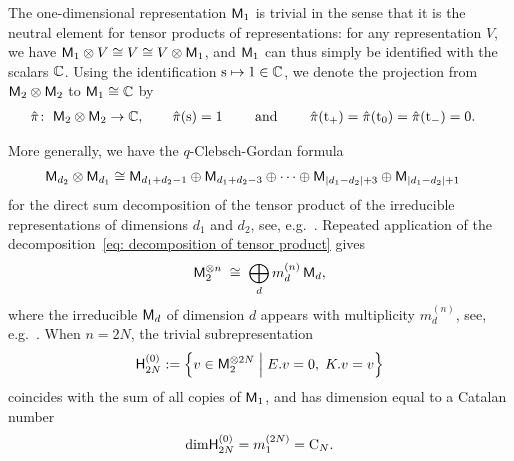 \documentclass[oneside,english]{amsart}
\numberwithin{equation}{section}
\numberwithin{figure}{section}
\theoremstyle{plain}
\theoremstyle{plain}
\theoremstyle{plain}
\theoremstyle{remark}
\theoremstyle{plain}
\theoremstyle{plain}
\theoremstyle{plain}
\theoremstyle{plain}
\theoremstyle{plain}
\theoremstyle{plain}
\theoremstyle{plain}
\theoremstyle{plain}
\newcommand{\blue}[1]{{\color{blue} #1}}
\begin{document}
The one-dimensional representation $\mathsf{M}_1$ is trivial in the sense that
it is the neutral element for tensor products of representations: for any representation $V$,
we have $\mathsf{M}_1 \otimes V \cong V \cong V \otimes \mathsf{M}_1$, and
$\mathsf{M}_1$ can thus simply be identified with 
the scalars $\mathbb{C}$.
Using the identification $\mathrm{s} \mapsto 1 \in \mathbb{C}$, we denote the
projection from $\mathsf{M}_2 \otimes \mathsf{M}_2$ to $\mathsf{M}_1 \cong \mathbb{C}$ by
\begin{align}\label{eq: projection to singlet}
\hat{\pi}\colon\; &\mathsf{M}_{2}\otimes\mathsf{M}_{2}\to \mathbb{C} , \qquad
\hat{\pi}(\mathrm{s}) = 1 \qquad \text{ and } \qquad
\hat{\pi}(\mathrm{t}_{+}) = \hat{\pi}(\mathrm{t}_{0}) = \hat{\pi}(\mathrm{t}_{-}) = 0 .
\end{align}

More generally, we have the $q$-Clebsch-Gordan formula
\begin{align}\label{eq: decomposition of tensor product}
\mathsf{M}_{d_{2}}\otimes\mathsf{M}_{d_{1}}\cong\; &
    \mathsf{M}_{d_{1}+d_{2}-1}\oplus\mathsf{M}_{d_{1}+d_{2}-3}\oplus\cdots\oplus\mathsf{M}_{|d_{1}-d_{2}|+3}\oplus\mathsf{M}_{|d_{1}-d_{2}|+1} 
\end{align}
for the direct sum decomposition of the tensor product of 
the irreducible representations of dimensions $d_1$ and $d_2$,
see, e.g.~\cite[Lemma~2.4]{KP-conformally_covariant_boundary_correlation_functions_with_a_quantum_group}.
Repeated application of the 
decomposition~\eqref{eq: decomposition of tensor product} gives
\begin{align}\label{eq: tensor power of two dimensionals}
\mathsf{M}_2^{\otimes n} \; \cong \; \bigoplus_d m_d^{(n)} \, \mathsf{M}_d,
\end{align}
where the irreducible $\mathsf{M}_d$ of dimension $d$ appears with multiplicity
$m_d^{(n)}$, see, e.g.~\cite[Lemma~2.2]{KP-pure_partition_functions_of_multiple_SLEs}.
When $n = 2N$,
the trivial subrepresentation 
\begin{align} \label{eq: trivial submodule}
\mathsf{H}_{2N}^{(0)}
:= \left\{ v \in \mathsf{M}_{2}^{\otimes 2N}\;\Big|\;E.v=0 ,\;K.v=v\right\}
\end{align}
coincides with the sum of all %
copies of $\mathsf{M}_1$, and has dimension equal to a Catalan number
\[ \mathrm{dim} \mathsf{H}_{2N}^{(0)} = m_1^{(2N)} = \mathrm{C}_N . \]
\end{document}
